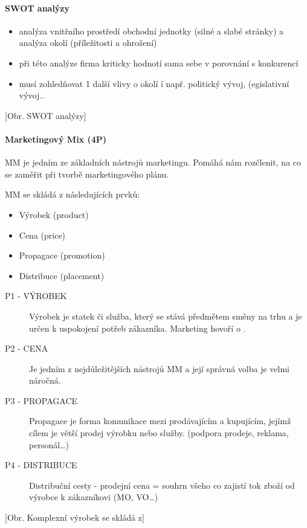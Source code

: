 \paragraph*{SWOT analýzy}
\begin{itemize}
    \item analýza vnitřního prostředí obchodní jednotky (silné a slabé stránky) a analýza okolí (příležitosti a ohrožení)
    \item při této analýze firma kriticky hodnotí sama sebe v porovnání s konkurencí
    \item musí zohledňovat 1 další vlivy o okolí í např. politický vývoj, (egislativní vývoj..
\end{itemize}

[Obr. SWOT analýzy]

\paragraph*{Marketingový Mix (4P)}
MM je jedním ze základních nástrojů marketingu. Pomáhá nám rozčlenit, na co se zaměřit při tvorbě marketingového plánu.

MM se skládá z následujících prvků:
\begin{itemize}
    \item Výrobek (product)
    \item Cena (price)
    \item Propagace (promotion)
    \item Distribuce (placement)
\end{itemize}

\begin{description}
    \item[P1 - VÝROBEK] Výrobek je statek či služba, který se stává předmětem směny na trhu a je určen k uspokojení potřeb zákazníka. Marketing hovoří o .
    \item[P2 - CENA] Je jedním z nejdůležitějších nástrojů MM a její správná volba je velmi náročná.
    \item[P3 - PROPAGACE] Propagace je forma komunikace mezi prodávajícím a kupujícím, jejímž cílem je větší prodej výrobku nebo služby. (podpora prodeje, reklama, personál\ldots)
    \item[P4 - DISTRIBUCE] Distribuční cesty - prodejní cena = souhrn všeho co zajistí tok zboží od výrobce k zákazníkovi (MO, VO\ldots)
\end{description}

[Obr. Komplexní výrobek se skládá z]

